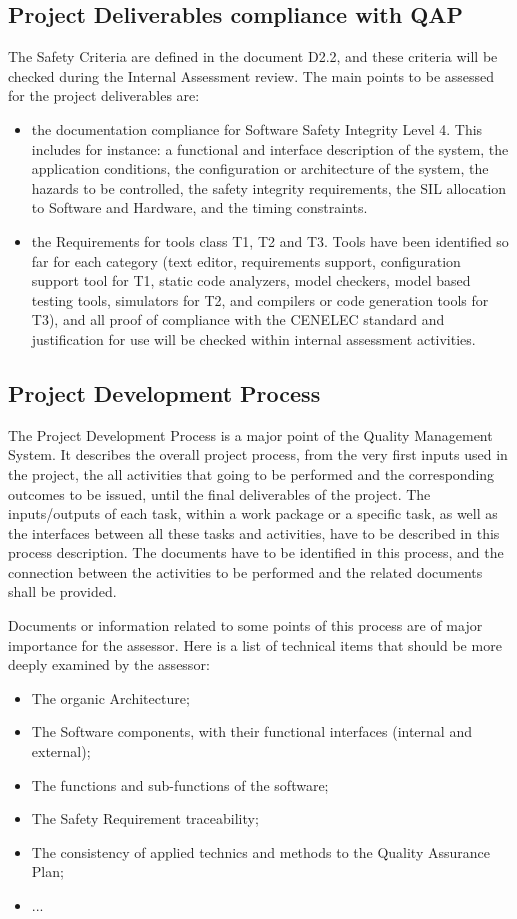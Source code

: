 \documentclass{template/openetcs_article}
\begin{document}
\subsection{Project Deliverables compliance with QAP}
The Safety Criteria are defined in the document D2.2, and these criteria will be checked during the Internal Assessment review. The main points to be assessed for the project deliverables are:
\begin{itemize}
\item the documentation compliance for Software Safety Integrity Level 4. This includes for instance: a functional and interface description of the system, the application conditions, the configuration or architecture of the system, the hazards to be controlled, the safety integrity requirements, the SIL allocation to Software and Hardware, and the timing constraints.
\item the Requirements for tools class T1, T2 and T3. Tools have been identified so far for each category (text editor, requirements support, configuration support tool for T1,  static code analyzers, model checkers, model based testing tools, simulators for T2, and compilers or code generation tools for T3), and all proof of compliance with the CENELEC standard and justification for use will be checked within internal assessment activities.
\end{itemize}

\subsection{Project Development Process}
The Project Development Process is a major point of the Quality Management System. It describes the overall project process, from the very first inputs used in the project, the all activities that going to be performed and the corresponding outcomes to be issued, until the final deliverables of the project. The inputs/outputs of each task, within a work package or a specific task, as well as the interfaces between all these tasks and activities, have to be described in this process description.
The documents have to be identified in this process, and the connection  between the activities to be performed and the related documents shall be provided.

Documents or information related to some points of this process are of major importance for the assessor. Here is a list of technical items that should be more deeply examined by the assessor:
\begin{itemize}
\item The organic Architecture;
\item The Software components, with their functional interfaces (internal and external);
\item The functions and sub-functions of the software;
\item The Safety Requirement traceability;
\item The consistency of applied technics and methods to the Quality Assurance Plan;
\item ...
\end{itemize}
\end{document}
